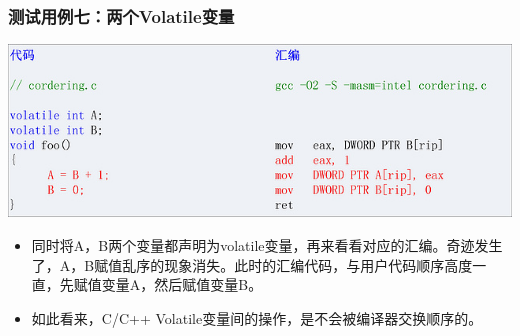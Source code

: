 \documentclass[9pt,b5paper]{article}
\begin{document}
\subsubsection{测试用例七：两个Volatile变量}
\label{sec-9-3-3}
\includegraphics[width=.9\linewidth]{../pic/v8.jpg}
\begin{itemize}
\item 同时将A，B两个变量都声明为volatile变量，再来看看对应的汇编。奇迹发生了，A，B赋值乱序的现象消失。此时的汇编代码，与用户代码顺序高度一直，先赋值变量A，然后赋值变量B。
\item 如此看来，C/C++ Volatile变量间的操作，是不会被编译器交换顺序的。
\end{itemize}
\end{document}
